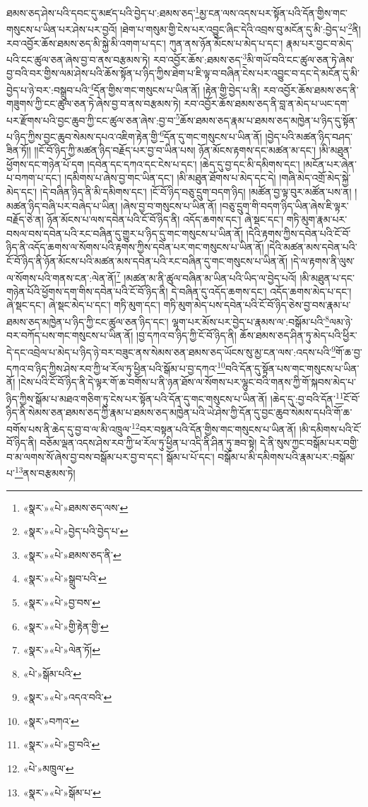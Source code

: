 ཐམས་ཅད་ཤེས་པའི་དབང་དུ་མཛད་པའི་བྱེད་པ་:ཐམས་ཅད་\footnote{«སྣར་»«པེ་»ཐམས་ཅད་ལས་}མྱ་ངན་ལས་འདས་པར་སྟོན་པའི་དོན་གྱིས་གང་གསུངས་པ་ཡིན་པར་ཤེས་པར་བྱའོ། །ཐེག་པ་གསུམ་གྱི་ངེས་པར་འབྱུང་ཞིང་དེའི་འབྲས་བུ་མངོན་དུ་མི་:བྱེད་པ་\footnote{«སྣར་»«པེ་»བྱེད་པའི་བྱེད་པ་}ནི། རབ་འབྱོར་ཆོས་ཐམས་ཅད་མི་སྐྱེ་མི་འགག་པ་དང་། ཀུན་ནས་ཉོན་མོངས་པ་མེད་པ་དང་། རྣམ་པར་བྱང་བ་མེད་པའི་ངང་ཚུལ་ཅན་ཞེས་བྱ་བ་ནས་བརྩམས་ཏེ། རབ་འབྱོར་ཆོས་:ཐམས་ཅད་\footnote{«སྣར་»«པེ་»ཐམས་ཅད་ནི་}མི་གཡོ་བའི་ངང་ཚུལ་ཅན་ཏེ་ཞེས་བྱ་བའི་བར་གྱིས་ལམ་ཤེས་པའི་ཆོས་སྟོན་པ་ཉིད་ཀྱིས་ཐེག་པ་ཇི་ལྟ་བ་བཞིན་ངེས་པར་འབྱུང་བ་དང་དེ་མངོན་དུ་མི་བྱེད་པ་ཉེ་བར་:བསྒྲུབ་པའི་\footnote{«སྣར་»«པེ་»སྒྲུབ་པའི་}དོན་གྱིས་གང་གསུངས་པ་ཡིན་ནོ། །རྟེན་གྱི་བྱེད་པ་ནི། རབ་འབྱོར་ཆོས་ཐམས་ཅད་ནི་གཟུགས་ཀྱི་ངང་ཚུལ་ཅན་ཏེ་ཞེས་བྱ་བ་ནས་བརྩམས་ཏེ། རབ་འབྱོར་ཆོས་ཐམས་ཅད་ནི་བླ་ན་མེད་པ་ཡང་དག་པར་རྫོགས་པའི་བྱང་ཆུབ་ཀྱི་ངང་ཚུལ་ཅན་ཞེས་:བྱ་བ་\footnote{«སྣར་»«པེ་»བྱ་བས་}ཆོས་ཐམས་ཅད་རྣམ་པ་ཐམས་ཅད་མཁྱེན་པ་ཉིད་དུ་སྟོན་པ་ཉིད་ཀྱིས་བྱང་ཆུབ་སེམས་དཔའ་འཇིག་རྟེན་གྱི་\footnote{«སྣར་»«པེ་»གྱི་རྟེན་གྱི་}དོན་དུ་གང་གསུངས་པ་ཡིན་ནོ། །བྱེད་པའི་མཚན་ཉིད་བཤད་ཟིན་ཏོ།། །།ངོ་བོ་ཉིད་ཀྱི་མཚན་ཉིད་བརྗོད་པར་བྱ་བ་ཡིན་པས། ཉོན་མོངས་རྟགས་དང་མཚན་མ་དང་། །མི་མཐུན་ཕྱོགས་དང་གཉེན་པོ་དག །དབེན་དང་དཀའ་དང་ངེས་པ་དང་། །ཆེད་དུ་བྱ་དང་མི་དམིགས་དང་། །མངོན་པར་ཞེན་པ་བཀག་པ་དང་། །དམིགས་པ་ཞེས་བྱ་གང་ཡིན་དང་། །མི་མཐུན་ཐོགས་པ་མེད་དང་དེ། །གཞི་མེད་འགྲོ་མེད་སྐྱེ་མེད་དང་། །དེ་བཞིན་ཉིད་ནི་མི་དམིགས་དང་། །ངོ་བོ་ཉིད་བཅུ་དྲུག་བདག་ཉིད། །མཚོན་བྱ་ལྟ་བུར་མཚོན་པས་ན། །མཚན་ཉིད་བཞི་པར་བཞེད་པ་ཡིན། །ཞེས་བྱ་བ་གསུངས་པ་ཡིན་ནོ། །བཅུ་དྲུག་གི་བདག་ཉིད་ཡིན་ཞེས་ཇི་ལྟར་བརྗོད་ཅེ་ན། ཉོན་མོངས་པ་ལས་དབེན་པའི་ངོ་བོ་ཉིད་ནི། འདོད་ཆགས་དང་། ཞེ་སྡང་དང་། གཏི་མུག་རྣམ་པར་བསལ་བས་དབེན་པའི་རང་བཞིན་དུ་གྱུར་པ་ཉིད་དུ་གང་གསུངས་པ་ཡིན་ནོ། །དེའི་རྟགས་ཀྱིས་དབེན་པའི་ངོ་བོ་ཉིད་ནི་འདོད་ཆགས་ལ་སོགས་པའི་རྟགས་ཀྱིས་དབེན་པར་གང་གསུངས་པ་ཡིན་ནོ། །དེའི་མཚན་མས་དབེན་པའི་ངོ་བོ་ཉིད་ནི་ཉོན་མོངས་པའི་མཚན་མས་དབེན་པའི་རང་བཞིན་དུ་གང་གསུངས་པ་ཡིན་ནོ། །དེ་ལ་རྟགས་ནི་ལུས་ལ་སོགས་པའི་གནས་ངན་:ལེན་ནོ།\footnote{«སྣར་»«པེ་»ལེན་ཏོ།} །མཚན་མ་ནི་ཚུལ་བཞིན་མ་ཡིན་པའི་ཡིད་ལ་བྱེད་པའོ། །མི་མཐུན་པ་དང་གཉེན་པོའི་ཕྱོགས་དག་གིས་དབེན་པའི་ངོ་བོ་ཉིད་ནི། དེ་བཞིན་དུ་འདོད་ཆགས་དང་། འདོད་ཆགས་མེད་པ་དང་། ཞེ་སྡང་དང་། ཞེ་སྡང་མེད་པ་དང་། གཏི་མུག་དང་། གཏི་མུག་མེད་པས་དབེན་པའི་ངོ་བོ་ཉིད་ཅེས་བྱ་བས་རྣམ་པ་ཐམས་ཅད་མཁྱེན་པ་ཉིད་ཀྱི་ངང་ཚུལ་ཅན་ཉིད་དང་། ལྷག་པར་མོས་པར་བྱེད་པ་རྣམས་ལ་:བསྒོམ་པའི་\footnote{«པེ་»སྒོམ་པའི་}ལམ་ཉེ་བར་བཀོད་པས་གང་གསུངས་པ་ཡིན་ནོ། །བྱ་དཀའ་བ་ཉིད་ཀྱི་ངོ་བོ་ཉིད་ནི། ཆོས་ཐམས་ཅད་ཤིན་ཏུ་མེད་པའི་ཕྱིར་དེ་དང་འབྲེལ་པ་མེད་པ་ཉིད་ཉེ་བར་བཟུང་ནས་སེམས་ཅན་ཐམས་ཅད་ཡོངས་སུ་མྱ་ངན་ལས་:འདས་པའི་\footnote{«སྣར་»«པེ་»འདའ་བའི་}གོ་ཆ་བྱ་དཀའ་བ་ཉིད་ཀྱིས་ཤེས་རབ་ཀྱི་ཕ་རོལ་ཏུ་ཕྱིན་པའི་སྒོམ་པ་བྱ་དཀའ་\footnote{«སྣར་»བཀའ་}བའི་དོན་དུ་སྟོན་པས་གང་གསུངས་པ་ཡིན་ནོ། །ངེས་པའི་ངོ་བོ་ཉིད་ནི་དེ་ལྟར་གོ་ཆ་བགོས་པ་ནི་ཉན་ཐོས་ལ་སོགས་པར་ལྷུང་བའི་གནས་ཀྱི་གོ་སྐབས་མེད་པ་ཉིད་ཀྱིས་སྒོམ་པ་མཐའ་གཅིག་ཏུ་ངེས་པར་སྟོན་པའི་དོན་དུ་གང་གསུངས་པ་ཡིན་ནོ། །ཆེད་དུ་:བྱ་བའི་དོན་\footnote{«སྣར་»«པེ་»བྱ་བའི་}ངོ་བོ་ཉིད་ནི་སེམས་ཅན་ཐམས་ཅད་ཀྱི་རྣམ་པ་ཐམས་ཅད་མཁྱེན་པའི་ཡེ་ཤེས་ཀྱི་དོན་དུ་བྱང་ཆུབ་སེམས་དཔའི་གོ་ཆ་བགོས་པས་ནི་ཆེད་དུ་བྱ་བ་ལ་མི་འཁྲུལ་\footnote{«པེ་»མཁྲུལ་}བར་བསྟན་པའི་དོན་གྱིས་གང་གསུངས་པ་ཡིན་ནོ། །མི་དམིགས་པའི་ངོ་བོ་ཉིད་ནི། བཅོམ་ལྡན་འདས་ཤེས་རབ་ཀྱི་ཕ་རོལ་ཏུ་ཕྱིན་པ་འདི་ནི་ཤིན་ཏུ་ཟབ་སྟེ། དེ་ནི་སུས་ཀྱང་བསྒོམ་པར་བགྱི་བ་མ་ལགས་སོ་ཞེས་བྱ་བས་བསྒོམ་པར་བྱ་བ་དང་། སྒོམ་པ་པོ་དང་། བསྒོམ་པ་མི་དམིགས་པའི་རྣམ་པར་:བསྒོམ་པ་\footnote{«སྣར་»«པེ་»སྒོམ་པ་}ནས་བརྩམས་ཏེ། 
